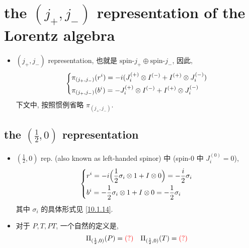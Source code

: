 \section{the \texorpdfstring{$(j_+, j_-)$}{(j+, j-)} representation of the Lorentz algebra}
\begin{itemize}
	\item $(j_+, j_-)$ representation, 也就是 $\text{spin-} j_+ \oplus \text{spin-} j_-$, 因此,
	\begin{equation}
		\begin{dcases}
			\pi_{(j_+, j_-)}(r^i) = - i (J^{(+)}_i \otimes I^{(-)} + I^{(+)} \otimes J^{(-)}_i) \\
			\pi_{(j_+, j_-)}(b^i) = - J^{(+)}_i \otimes I^{(-)} + I^{(+)} \otimes J^{(-)}_i
		\end{dcases}
	\end{equation}
	下文中, 按照惯例省略 $\pi_{(j_+, j_-)}$.
\end{itemize}

\subsection{the \texorpdfstring{$(\frac{1}{2}, 0)$}{(1/2, 0)} representation}
\begin{itemize}
	\item $(\frac{1}{2}, 0)$ rep. (also known as left-handed spinor) 中 (spin-$0$ 中 $J^{(0)}_i = 0$),
	\begin{equation}
		\begin{dcases}
			r^i = - i \Big( \frac{1}{2} \sigma_i \otimes 1 + I \otimes 0 \Big) = - \frac{i}{2} \sigma_i \\
			b^i = - \frac{1}{2} \sigma_i \otimes 1 + I \otimes 0 = - \frac{1}{2} \sigma_i
		\end{dcases}
	\end{equation}
	其中 $\sigma_i$ 的具体形式见 \eqref{10.1.14}.
	
	\item 对于 $P, T, P T$, 一个自然的定义是,
	\begin{equation}
		\Pi_{(\frac{1}{2}, 0)}(P) = \mathcolor{red}{(?)} \quad \Pi_{(\frac{1}{2}, 0)}(T) = \mathcolor{red}{(?)}
	\end{equation}
\end{itemize}


